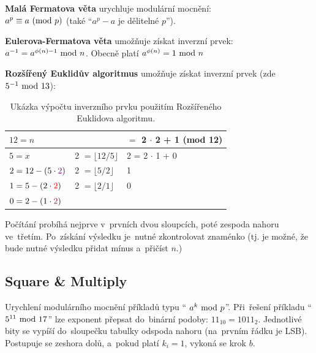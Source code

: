 \vspace*{1em} \noindent
\textbf{Malá Fermatova věta} urychluje modulární mocnění: \\
$a^p \equiv a \ (\mathrm{mod}\ p)$ (také \enquote{$a^p - a$ je dělitelné $p$}).

\vspace*{1em} \noindent
\textbf{Eulerova-Fermatova věta} umožňuje získat inverzní prvek: \\
$a^{-1} = a^{\phi(n) - 1} \ \mathrm{mod}\ n$. Obecně platí $a^{\phi(n)} = 1 \ \mathrm{mod}\ n$

\vspace*{1em} \noindent
\textbf{Rozšířený Euklidův algoritmus} umožňuje získat inverzní prvek (zde $5^{-1} \ \mathrm{mod}\ 13$):

\begin{table}[ht]
	\centering
\begin{tabular}{ll|l}
	$12 = n$                               & {}                                           & \boxed{\stackrel{?}{\pm} 5} $=$ {\color{violet}2} $\cdot$ {\color{blue}2} + {\color{brown}1} (mod 12) \\
	\hline
	$5 = x$                                & {\color{violet}2} $= \lfloor 12 / 5 \rfloor$ & {\color{blue}2} = {\color{red}2} $\cdot$ {\color{brown}1} + {\color{teal}0} \\
	$2 = 12 - (5 \cdot {\color{violet}2})$ & {\color{red}2}    $= \lfloor 5 / 2 \rfloor$  & {\color{brown}1} \\
	$1 = 5 - (2 \cdot {\color{red}2})$     & {\color{purple}2} $= \lfloor 2 / 1 \rfloor$  & {\color{teal}0} \\
	$0 = 2 - (1 \cdot {\color{purple}2})$  & {}                                           & {}
\end{tabular}
\caption*{Ukázka výpočtu inverzního prvku použitím Rozšířeného Euklidova algoritmu.}
\end{table}

\noindent
Počítání probíhá nejprve v~prvních dvou sloupcích, poté zespoda nahoru ve~třetím. Po~získání výsledku je~nutné zkontrolovat znaménko (tj. je možné, že bude nutné výsledku přidat mínus a~přičíst $n$.)

\subsection{Square \& Multiply}

Urychlení modulárního mocnění příkladů typu \enquote{ $a^k \ \mathrm{mod}\ p$}. Při~řešení příkladu \enquote{$5^{11} \ \mathrm{mod}\ 17$} lze exponent přepsat do~binární podoby: $11_{10} = 1011_2$. Jednotlivé bity se vypíší do~sloupečku tabulky odspoda nahoru (na~prvním řádku je LSB). Postupuje se zeshora dolů, a~pokud platí $k_i = 1$, vykoná se krok $b$.

